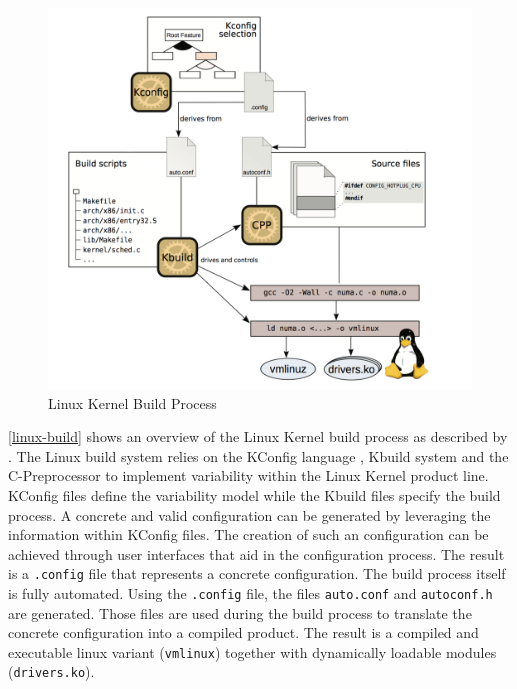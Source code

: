 \documentclass[a4paper]{article}
\begin{document}
\begin{figure}[h] 
  \centering
  \begin{minipage}[b]{1\textwidth} 
    \caption[Linux build process]{Linux Kernel Build Process \cite{Dietrich:2012:RAV:2362536.2362544}}\label{linux-build}
    \includegraphics[width=1\textwidth]{img/linux-build2.png}
  \end{minipage}
\end{figure}

\autoref{linux-build} shows an overview of the Linux Kernel build process as described by \cite{Dietrich:2012:RAV:2362536.2362544}. The Linux build system relies on the KConfig language \cite{kconfig-language.txt}, Kbuild system \cite{makefiles.txt} and the C-Preprocessor to implement variability within the Linux Kernel product line. KConfig files  define the variability model while the Kbuild files specify the build process. A concrete and valid configuration can be generated by leveraging the information within KConfig files. The creation of such an configuration can be achieved through user interfaces that aid in the configuration process. The result is a \texttt{.config} file that represents a concrete configuration. The build process itself is fully automated. Using the \texttt{.config} file, the files \texttt{auto.conf} and \texttt{autoconf.h} are generated. Those files are used during the build process to translate the concrete configuration into a compiled product. The result is a compiled and executable linux variant (\texttt{vmlinux}) together with dynamically loadable modules (\texttt{drivers.ko}).
\end{document}
